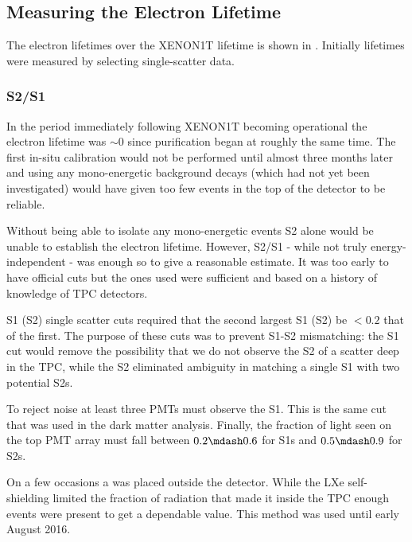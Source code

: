 \subsection{Measuring the Electron Lifetime}
\label{subsec:electron_lifetimes_measurement}
The electron lifetimes over the XENON1T lifetime is shown in .  Initially lifetimes were
measured by selecting single-scatter data.



\subsubsection{S2/S1}
\label{subsubsec:electron_lifetimes_measurement_ss}
In the period immediately following XENON1T becoming operational the electron lifetime was ${\sim} 0$ since purification began at roughly
the same time.  The first in-situ calibration would not be performed until almost three months later and using any mono-energetic
background decays (which had not yet been investigated) would have given too few events in the top of the detector to be reliable.

Without being able to isolate any mono-energetic events S2 alone would be unable to establish the electron lifetime.  However,
S2/S1 - while not truly energy-independent - was enough so to give a reasonable estimate.  It was too early to have official cuts but
the ones used were sufficient and based on a history of knowledge of TPC detectors.

S1 (S2) single scatter cuts required that the second largest S1 (S2) be $< 0.2$ that of the first.  The purpose of these cuts was to
prevent S1-S2 mismatching: the S1 cut would
remove the possibility that we do not observe the S2 of a scatter deep in the TPC, while the S2 eliminated ambiguity in matching a single
S1 with two potential S2s.

To reject noise at least three PMTs must observe the S1.  This is the same cut that was used in the dark matter analysis.  Finally, the
fraction of light seen on the top PMT array must fall between $0.2 \mdash 0.6$ for S1s and $0.5 \mdash 0.9$ for S2s.

On a few occasions a  was placed outside the detector.  While the LXe self-shielding limited the fraction of radiation that
made it inside the TPC enough events were present to get a dependable value.  This method was used until early August 2016.



